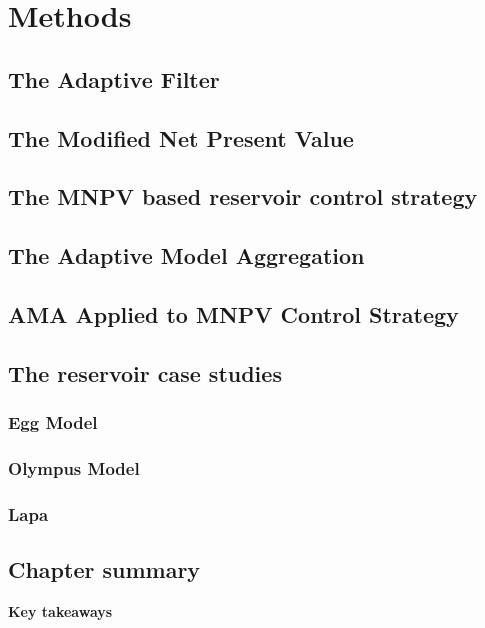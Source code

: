 \chapter{Methods}

\blindtext[1]

\section{The Adaptive Filter}
    \blindtext[1]

\section{The Modified Net Present Value}
    \blindtext[1]

\section{The MNPV based reservoir control strategy}
    \blindtext[1]

\section{The Adaptive Model Aggregation}
    \blindtext[1]

\section{AMA Applied to MNPV Control Strategy}
    \blindtext[1]

\section{The reservoir case studies}
    \blindtext[1]

    \subsection{Egg Model}
        \blindtext[1]

    \subsection{Olympus Model}
        \blindtext[1]

    \subsection{Lapa}
        \blindtext[1]

\section{Chapter summary}
    \begin{mdframed}[style=plainSty,innertopmargin=8pt] %
        {\center \textbf{\sffamily Key takeaways} \par}
        \noindent 
        \blindtext[1]
    \end{mdframed}